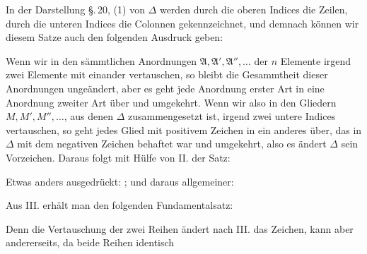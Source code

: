 
In der Darstellung \S.\,20, (1) von \(\Delta\) werden durch die oberen Indices die Zeilen, durch die unteren Indices die Colonnen gekennzeichnet, und demnach können wir diesem Satze auch den folgenden Ausdruck geben:


Wenn wir in den sämmtlichen Anordnungen \(\mathfrak A,\mathfrak A',\mathfrak A'',\ldots\) der \(n\) Elemente irgend zwei Elemente mit einander vertauschen, so bleibt die Gesammtheit dieser Anordnungen ungeändert, aber es geht jede Anordnung erster Art in eine Anordnung zweiter Art über und umgekehrt. Wenn wir also in den Gliedern \(M,M',M'',\ldots\), aus denen \(\Delta\) zusammengesetzt ist, irgend zwei untere Indices vertauschen, so geht jedes Glied mit positivem Zeichen in ein anderes über, das in \(\Delta\) mit dem negativen Zeichen behaftet war und umgekehrt, also es ändert \(\Delta\) sein Vorzeichen. Daraus folgt mit Hülfe von II. der Satz:


Etwas anders ausgedrückt: ; und daraus allgemeiner:


Aus III. erhält man den folgenden Fundamentalsatz:


Denn die Vertauschung der zwei Reihen ändert nach III. das Zeichen, kann aber andererseits, da beide Reihen identisch
